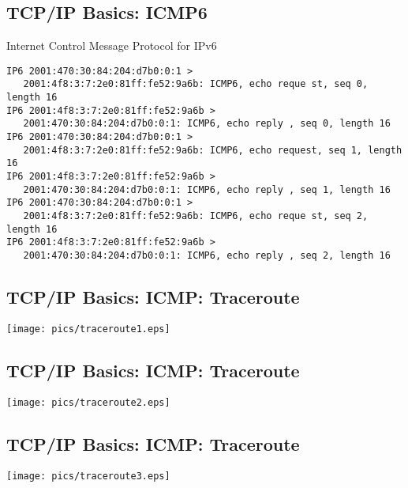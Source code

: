 \documentclass[xga]{xdvislides}
\begin{document}
\subsection{TCP/IP Basics: ICMP6}
\begin{center}
Internet Control Message Protocol for IPv6
\end{center}
\vspace{.2in}

\begin{verbatim}
IP6 2001:470:30:84:204:d7b0:0:1 >
   2001:4f8:3:7:2e0:81ff:fe52:9a6b: ICMP6, echo reque st, seq 0, length 16
IP6 2001:4f8:3:7:2e0:81ff:fe52:9a6b >
   2001:470:30:84:204:d7b0:0:1: ICMP6, echo reply , seq 0, length 16
IP6 2001:470:30:84:204:d7b0:0:1 >
   2001:4f8:3:7:2e0:81ff:fe52:9a6b: ICMP6, echo request, seq 1, length 16
IP6 2001:4f8:3:7:2e0:81ff:fe52:9a6b >
   2001:470:30:84:204:d7b0:0:1: ICMP6, echo reply , seq 1, length 16
IP6 2001:470:30:84:204:d7b0:0:1 >
   2001:4f8:3:7:2e0:81ff:fe52:9a6b: ICMP6, echo reque st, seq 2, length 16
IP6 2001:4f8:3:7:2e0:81ff:fe52:9a6b >
   2001:470:30:84:204:d7b0:0:1: ICMP6, echo reply , seq 2, length 16
\end{verbatim}

\subsection{TCP/IP Basics: ICMP: Traceroute}
\vspace*{\fill}
\begin{center}
	\texttt{[image: pics/traceroute1.eps]}
\end{center}
\vspace*{\fill}

\subsection{TCP/IP Basics: ICMP: Traceroute}
\vspace*{\fill}
\begin{center}
	\texttt{[image: pics/traceroute2.eps]}
\end{center}
\vspace*{\fill}

\subsection{TCP/IP Basics: ICMP: Traceroute}
\vspace*{\fill}
\begin{center}
	\texttt{[image: pics/traceroute3.eps]}
\end{center}
\vspace*{\fill}
\end{document}
